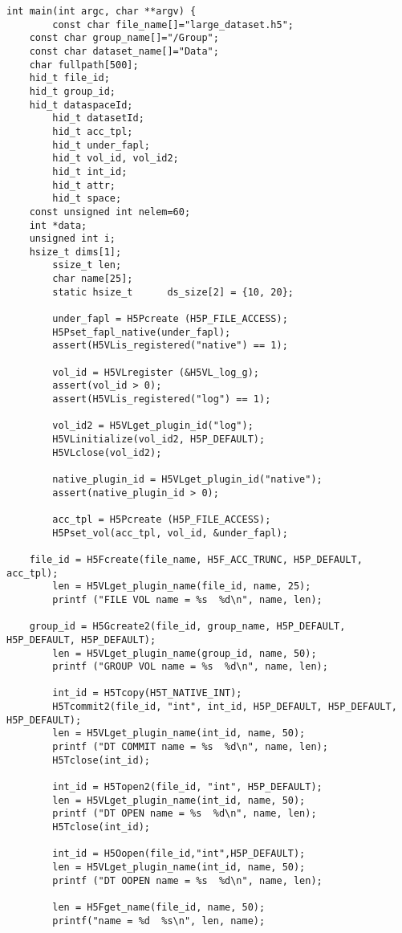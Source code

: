 \begin{lstlisting}
int main(int argc, char **argv) {
        const char file_name[]="large_dataset.h5";
	const char group_name[]="/Group";
	const char dataset_name[]="Data";
	char fullpath[500];
	hid_t file_id;
	hid_t group_id;
	hid_t dataspaceId;
        hid_t datasetId;
        hid_t acc_tpl;
        hid_t under_fapl;
        hid_t vol_id, vol_id2;
        hid_t int_id;
        hid_t attr;
        hid_t space;
	const unsigned int nelem=60;
	int *data;
	unsigned int i;
	hsize_t dims[1];
        ssize_t len;
        char name[25];
        static hsize_t      ds_size[2] = {10, 20};

        under_fapl = H5Pcreate (H5P_FILE_ACCESS);
        H5Pset_fapl_native(under_fapl);
        assert(H5VLis_registered("native") == 1);

        vol_id = H5VLregister (&H5VL_log_g);
        assert(vol_id > 0);
        assert(H5VLis_registered("log") == 1);

        vol_id2 = H5VLget_plugin_id("log");
        H5VLinitialize(vol_id2, H5P_DEFAULT);
        H5VLclose(vol_id2);

        native_plugin_id = H5VLget_plugin_id("native");
        assert(native_plugin_id > 0);

        acc_tpl = H5Pcreate (H5P_FILE_ACCESS);
        H5Pset_vol(acc_tpl, vol_id, &under_fapl);

	file_id = H5Fcreate(file_name, H5F_ACC_TRUNC, H5P_DEFAULT, acc_tpl);
        len = H5VLget_plugin_name(file_id, name, 25);
        printf ("FILE VOL name = %s  %d\n", name, len);

	group_id = H5Gcreate2(file_id, group_name, H5P_DEFAULT, H5P_DEFAULT, H5P_DEFAULT);
        len = H5VLget_plugin_name(group_id, name, 50);
        printf ("GROUP VOL name = %s  %d\n", name, len);

        int_id = H5Tcopy(H5T_NATIVE_INT);
        H5Tcommit2(file_id, "int", int_id, H5P_DEFAULT, H5P_DEFAULT, H5P_DEFAULT);
        len = H5VLget_plugin_name(int_id, name, 50);
        printf ("DT COMMIT name = %s  %d\n", name, len);
        H5Tclose(int_id);

        int_id = H5Topen2(file_id, "int", H5P_DEFAULT);
        len = H5VLget_plugin_name(int_id, name, 50);
        printf ("DT OPEN name = %s  %d\n", name, len);
        H5Tclose(int_id);

        int_id = H5Oopen(file_id,"int",H5P_DEFAULT);
        len = H5VLget_plugin_name(int_id, name, 50);
        printf ("DT OOPEN name = %s  %d\n", name, len);

        len = H5Fget_name(file_id, name, 50);
        printf("name = %d  %s\n", len, name);


\end{lstlisting}
